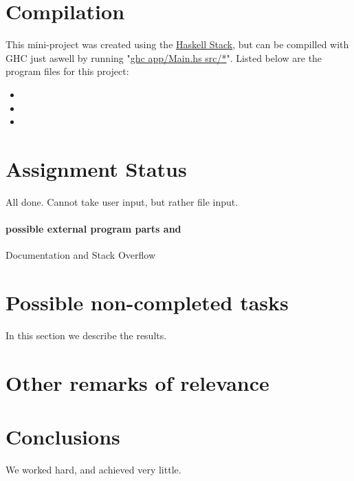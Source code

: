 \documentclass{article}
\begin{document}
\section{Compilation}

This mini-project was created using the \href{https://docs.haskellstack.org/en/stable/README/}{Haskell Stack}, but can be compilled with GHC just aswell by running "\url{ghc app/Main.hs src/*}". Listed below are the program files for this project:

\begin{itemize}
    \item {}
    \item {}
    \item {}
\end{itemize}

\section{Assignment Status}

All done. Cannot take user input, but rather file input.

\paragraph{possible external program parts and} 
Documentation and Stack Overflow

\section{Possible non-completed tasks}
In this section we describe the results.

\section{Other remarks of relevance}

\section{Conclusions}
We worked hard, and achieved very little.



\end{document}
